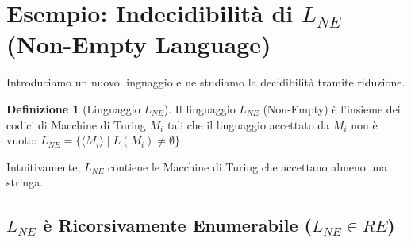 \documentclass[a4paper]{article}
\theoremstyle{definition} %
\newtheorem{definition}[theorem]{Definizione}
\begin{document}
\section{Esempio: Indecidibilità di $L_{NE}$ (Non-Empty Language)}

Introduciamo un nuovo linguaggio e ne studiamo la decidibilità tramite riduzione.

\begin{definition}[Linguaggio $L_{NE}$]
Il linguaggio $L_{NE}$ (Non-Empty) è l'insieme dei codici di Macchine di Turing $M_i$ tali che il linguaggio accettato da $M_i$ non è vuoto:
$L_{NE} = \{ \langle M_i \rangle \mid L(M_i) \neq \emptyset \}$

Intuitivamente, $L_{NE}$ contiene le Macchine di Turing che accettano almeno una stringa.
\end{definition}

\subsection{$L_{NE}$ è Ricorsivamente Enumerabile ($L_{NE} \in RE$)}
\end{document}
